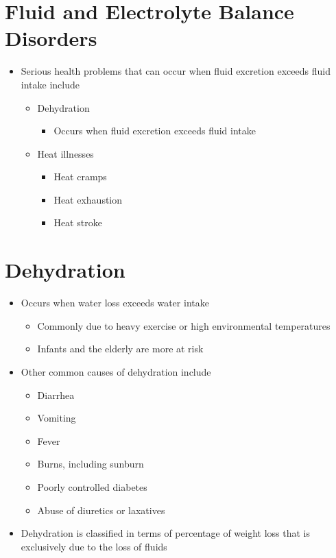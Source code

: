 \documentclass[title={Chapter 7}]{fdsn201notes}
\begin{document}
\section{Fluid and Electrolyte Balance Disorders}\label{sec:fluid-and-electrolyte-balance-disorders}
\begin{itemize}
	\item Serious health problems that can occur when fluid excretion exceeds fluid intake include
	\begin{itemize}
		\item Dehydration
		\begin{itemize}
			\item Occurs when fluid excretion exceeds fluid intake
		\end{itemize}
		\item Heat illnesses
		\begin{itemize}
			\item Heat cramps
			\item Heat exhaustion
			\item Heat stroke
		\end{itemize}
	\end{itemize}
\end{itemize}

\section{Dehydration}\label{sec:dehydration}
\begin{itemize}
	\item Occurs when water loss exceeds water intake
	\begin{itemize}
		\item Commonly due to heavy exercise or high environmental temperatures
		\item Infants and the elderly are more at risk
	\end{itemize}
	\item Other common causes of dehydration include
	\begin{itemize}
		\item Diarrhea
		\item Vomiting
		\item Fever
		\item Burns, including sunburn
		\item Poorly controlled diabetes
		\item Abuse of diuretics or laxatives
	\end{itemize}
	\item Dehydration is classified in terms of percentage of weight loss that is exclusively due to the loss of fluids
\end{itemize}
\end{document}
